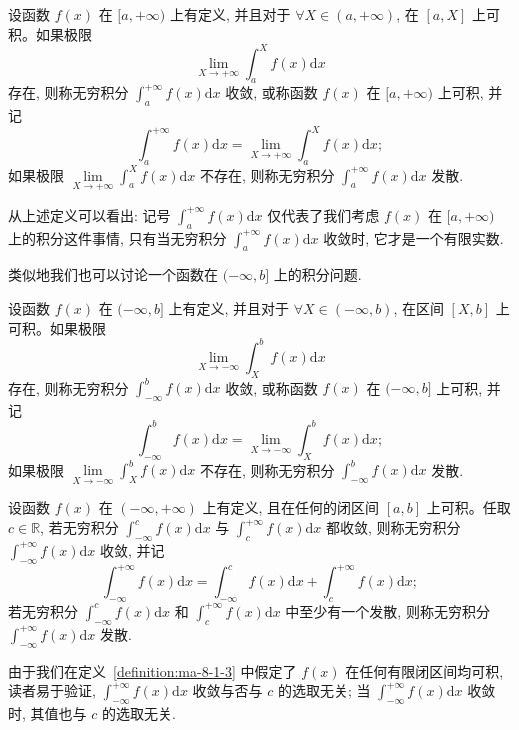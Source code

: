 \begin{definition}\label{definition:ma-8-1-1}
设函数 $f(x)$ 在 $[a,+\infty)$ 上有定义, 并且对于 $\forall X\in(a,+\infty)$, 在 $[a,X]$ 上可积。如果极限
\[
  \lim_{X\to+\infty}\int_a^X f(x)\mathrm dx
\]
存在, 则称无穷积分 $\int_a^{+\infty}f(x)\mathrm dx$ 收敛, 或称函数 $f(x)$ 在 $[a,+\infty)$ 上可积, 并记
\[
  \int_a^{+\infty}f(x)\mathrm dx=\lim_{X\to+\infty}\int_a^X f(x)\mathrm dx;
\]
如果极限 $\lim\limits_{X\to+\infty}\int_a^X f(x)\mathrm dx$ 不存在, 则称无穷积分 $\int_a^{+\infty}f(x)\mathrm dx$ 发散.
\end{definition}

从上述定义可以看出: 记号 $\int_a^{+\infty}f(x)\mathrm dx$ 仅代表了我们考虑 $f(x)$ 在 $[a,+\infty)$ 上的积分这件事情, 只有当无穷积分 $\int_a^{+\infty}f(x)\mathrm dx$ 收敛时, 它才是一个有限实数.

类似地我们也可以讨论一个函数在 $(-\infty,b]$ 上的积分问题.

\begin{definition}\label{definition:ma-8-1-2}
设函数 $f(x)$ 在 $(-\infty,b]$ 上有定义, 并且对于 $\forall X\in(-\infty,b)$, 在区间 $[X,b]$ 上可积。如果极限
\[
  \lim_{X\to-\infty}\int_X^b f(x)\mathrm dx
\]
存在, 则称无穷积分 $\int_{-\infty}^b f(x)\mathrm dx$ 收敛, 或称函数 $f(x)$ 在 $(-\infty,b]$ 上可积, 并记
\[
  \int_{-\infty}^b f(x)\mathrm dx=\lim_{X\to-\infty}\int_X^b f(x)\mathrm dx;
\]
如果极限 $\lim\limits_{X\to-\infty}\int_X^b f(x)\mathrm dx$ 不存在, 则称无穷积分 $\int_{-\infty}^b f(x)\mathrm dx$ 发散.
\end{definition}


\begin{definition}\label{definition:ma-8-1-3}
设函数 $f(x)$ 在 $(-\infty,+\infty)$ 上有定义, 且在任何的闭区间 $[a,b]$ 上可积。任取 $c\in\mathbb R$, 若无穷积分 $\int_{-\infty}^c f(x)\mathrm dx$ 与 $\int_c^{+\infty}f(x)\mathrm dx$ 都收敛, 则称无穷积分 $\int_{-\infty}^{+\infty}f(x)\mathrm dx$ 收敛, 并记
\[
  \int_{-\infty}^{+\infty}f(x)\mathrm dx
  =
  \int_{-\infty}^c f(x)\mathrm dx
  +
  \int_c^{+\infty}f(x)\mathrm dx;
\]
若无穷积分 $\int_{-\infty}^c f(x)\mathrm dx$ 和 $\int_c^{+\infty}f(x)\mathrm dx$ 中至少有一个发散, 则称无穷积分 $\int_{-\infty}^{+\infty}f(x)\mathrm dx$ 发散.
\end{definition}

由于我们在定义~\ref{definition:ma-8-1-3} 中假定了 $f(x)$ 在任何有限闭区间均可积, 读者易于验证, $\int_{-\infty}^{+\infty}f(x)\mathrm dx$ 收敛与否与 $c$ 的选取无关; 当 $\int_{-\infty}^{+\infty}f(x)\mathrm dx$ 收敛时, 其值也与 $c$ 的选取无关.

